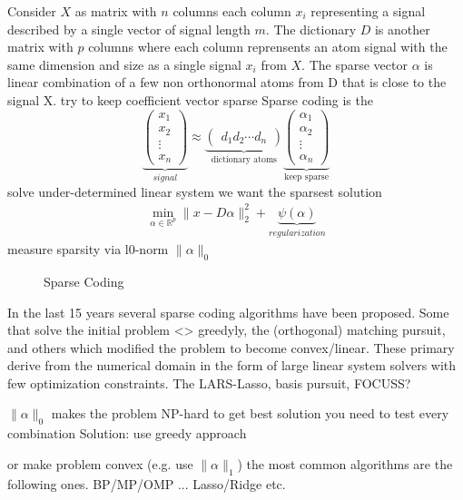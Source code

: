 Consider $X$ as matrix with $n$ columns each column $x_{i}$ representing a signal described by a single vector of signal length $m$.
The dictionary $D$ is another matrix with $p$ columns where each column reprensents an atom signal with the same dimension and size as a single signal $x_{i}$ from $X$.
The sparse vector $\alpha$ is linear combination of a few non orthonormal atoms from D that is close to the signal X.
try to keep coefficient vector sparse
Sparse coding is the 
\[
\underbrace{\begin{pmatrix} x_1 \\ x_2 \\ \vdots \\ x_n \end{pmatrix}}_{signal} \approx \underbrace{\begin{pmatrix} d_1  d_2 \cdots d_n \end{pmatrix}}_{\textrm{dictionary atoms}}
\underbrace{\begin{pmatrix} \alpha_1 \\ \alpha_2 \\ \vdots \\ \alpha_n \end{pmatrix}}_{\textrm{keep sparse}}
\]
solve under-determined linear system
we want the sparsest solution
\begin{align}
\min_{\alpha\in\mathbb{R}^{p}}  \lVert x - D\alpha \rVert^{2}_{2} + \underbrace{\psi(\alpha)}_{regularization}
\end{align}
measure sparsity via       l0-norm       $\lVert\alpha\rVert_{0}$

\begin{figure}
\centering
\caption{Sparse Coding}
\label{fig:da_x}
\end{figure}


In the last 15 years several sparse coding algorithms have been proposed. 
Some that solve the initial problem <> greedyly, the (orthogonal) matching pursuit, and others which modified the problem to become convex/linear. These primary derive from the numerical domain in the form of 
large linear system solvers with few optimization constraints. The LARS-Lasso, basis pursuit, FOCUSS?


$\lVert\alpha\rVert_{0}$ makes the problem NP-hard
to get best solution you need to test every combination
Solution:
use greedy approach 

or make problem convex (e.g. use $\lVert\alpha\rVert_{1}$)
the most common algorithms are the following ones.
BP/MP/OMP ...
Lasso/Ridge etc.






